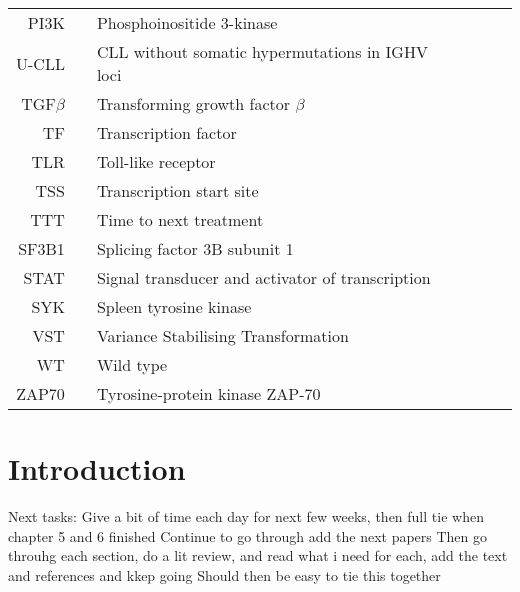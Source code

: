 \documentclass[11pt, a4paper, twosided]{book}
\begin{document}
\begin{tabular}{rp{0.2cm}lp{1cm}rp{0.2cm}l}
    PI3K & & Phosphoinositide 3-kinase \\
    U-CLL & & CLL without somatic hypermutations in IGHV loci \\
    TGF$\beta$ & & Transforming growth factor $\beta$ \\
    TF & & Transcription factor \\
    TLR & & Toll-like receptor \\ 
    TSS & & Transcription start site \\
    TTT & & Time to next treatment \\
    SF3B1 & & Splicing factor 3B subunit 1 \\
    STAT & & Signal transducer and activator of transcription \\
    SYK & & Spleen tyrosine kinase \\
    VST & & Variance Stabilising Transformation \\
    WT & & Wild type \\
    ZAP70 & & Tyrosine-protein kinase ZAP-70 \\

    
   
\end{tabular}
\newpage
\listoffigures
{}

\newpage
\listoftables
{}

\newpage
\pagestyle{plain}
\setcounter{page}{1}    %

\hypertarget{introduction}{%
\chapter{Introduction}\label{introduction}}

Next tasks:
Give a bit of time each day for next few weeks, then full tie when chapter 5 and 6 finished
Continue to go through add the next papers
Then go throuhg each section, do a lit review, and read what i need for each, add the text and references and kkep going
Should then be easy to tie this together
\end{document}

